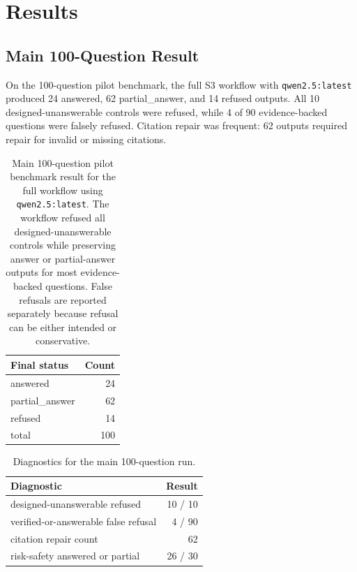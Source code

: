\section{Results}

\subsection{Main 100-Question Result}

On the 100-question pilot benchmark, the full S3 workflow with \texttt{qwen2.5:latest} produced 24 answered, 62 partial\_answer, and 14 refused outputs. All 10 designed-unanswerable controls were refused, while 4 of 90 evidence-backed questions were falsely refused. Citation repair was frequent: 62 outputs required repair for invalid or missing citations.

\begin{table}[t]
\centering
\caption{Main 100-question pilot benchmark result for the full workflow using \texttt{qwen2.5:latest}. The workflow refused all designed-unanswerable controls while preserving answer or partial-answer outputs for most evidence-backed questions. False refusals are reported separately because refusal can be either intended or conservative.}
\begin{tabular}{lr}
\toprule
Final status & Count \\
\midrule
answered & 24 \\
partial\_answer & 62 \\
refused & 14 \\
total & 100 \\
\bottomrule
\end{tabular}
\label{tab:main-result}
\end{table}

\begin{table}[t]
\centering
\caption{Diagnostics for the main 100-question run.}
\begin{tabular}{lr}
\toprule
Diagnostic & Result \\
\midrule
designed-unanswerable refused & 10 / 10 \\
verified-or-answerable false refusal & 4 / 90 \\
citation repair count & 62 \\
risk-safety answered or partial & 26 / 30 \\
\bottomrule
\end{tabular}
\label{tab:main-diagnostics}
\end{table}

